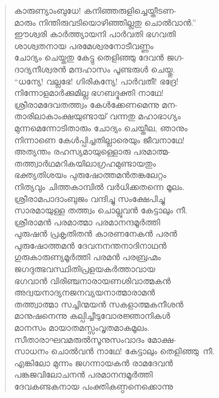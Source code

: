 \begin{verse}
കാരുണ്യാംബുധേ! കനിഞ്ഞരുളിച്ചെയ്തീടണ-\\
മാരും നിന്തിരുവടിയൊഴിഞ്ഞില്ലതു ചൊല്‍വാന്‍.”\\
ഈശ്വരി കാര്‍ത്ത്യായനി പാര്‍വതി ഭഗവതി\\
ശാശ്വതനായ പരമേശ്വരനോടീവണ്ണം\\
ചോദ്യം ചെയ്തതു കേട്ടു തെളിഞ്ഞു ദേവന്‍ ജഗ-\\
ദാദ്യനീശ്വരന്‍ മന്ദഹാസം പൂണ്ടരുള്‍ ചെയ്തു.\\
“ധന്യേ! വല്ലഭേ! ഗിരികന്യേ! പാര്‍വതീ! ഭദ്രേ!\\
നിന്നോളമാര്‍ക്കുമില്ല ഭഗബദ്ഭക്തി നാഥേ!\\
ശ്രീരാമദേവതത്ത്വം കേള്‍ക്കേണമെന്നു മന-\\
താരിലാകാംക്ഷയുണ്ടായ് വന്നതു മഹാഭാഗ്യം\\
മുന്നമെന്നോടിതാരും ചോദ്യം ചെയ്തീല, ഞാനും\\
നിന്നാണെ കേള്‍പ്പിച്ചതില്ലാരെയും ജീവനാഥേ!\\
അത്യന്തം രഹസ്യമായുള്ളൊരു പരമാത്മ-\\
തത്ത്വാര്‍ഥമറികയിലാഗ്രഹമുണ്ടായതും\\
ഭക്ത്യതിശയം പുരുഷോത്തമന്‍തങ്കലേറ്റം\\
നിത്യവും ചിത്തകാമ്പില്‍ വര്‍ധിക്കതന്നെ മൂലം.\\
ശ്രീരാമപാദാംബുജം വന്ദിച്ചു സംക്ഷേപിച്ചു\\
സാരമായുള്ള തത്ത്വം ചൊല്ലുവന്‍ കേട്ടാലും നീ.\\
ശ്രീരാമന്‍ പരമാത്മാ പരമാനന്ദമൂര്‍ത്തി\\
പുരുഷന്‍ പ്രകൃതിതന്‍ കാരണനേകന്‍ പരന്‍\\
പുരുഷോത്തമന്‍ ദേവനനന്തനാദിനാഥന്‍\\
ഗുരുകാരുണ്യമൂര്‍ത്തി പരമന്‍ പരബ്രഹ്മം\\
ജഗദുത്ഭവസ്ഥിതിപ്രളയകര്‍ത്താവായ\\
ഭഗവാന്‍ വിരിഞ്ചനാരായണശിവാത്മകന്‍\\
അദ്വയനാദ്യനജനവ്യയനാത്മാരാമന്‍\\
തത്ത്വാത്മാ സച്ചിന്മയന്‍ സകളാത്മകനീശന്‍\\
മാനുഷനെന്നു കല്പിച്ചീടുവോരജ്ഞാനികള്‍\\
മാനസം മായാതമസ്സംവൃതമാകമൂലം.\\
സീതാരാഘവമരുല്‍സൂനുസംവാദം മോക്ഷ-\\
സാധനം ചൊല്‍വന്‍ നാഥേ! കേട്ടാലും \hbox{തെളിഞ്ഞു നീ.}\\
എങ്കിലോ മുന്നം ജഗന്നായകന്‍ രാമദേവന്‍\\
പങ്കജവിലോചനന്‍ പരമാനന്ദമൂര്‍ത്തി\\
ദേവകണ്ടകനായ പംക്തികണ്ഠനെക്കൊന്നു\\

\end{verse}
